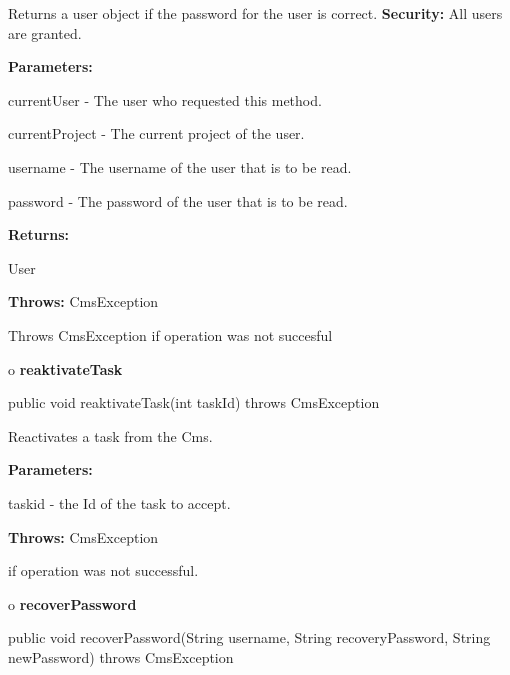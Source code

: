 \begin{description}
\htmlDD Returns a user object if the password for the user is correct. {\bf
Security:} All users are granted. 

\begin{description}
\item {\bf Parameters:}  

currentUser - The user who requested this method.  

currentProject - The current project of the user.  

username - The username of the user that is to be read.  

password - The password of the user that is to be read.  
\item {\bf Returns:}  

User  
\item {\bf Throws:} CmsException  

Throws CmsException if operation was not succesful  
\end{description}

\end{description}

o {\bf reaktivateTask} 

\begin{PRE}
 public void reaktivateTask(int taskId) throws CmsException
\end{PRE}

\begin{description}
\htmlDD Reactivates a task from the Cms. 

\begin{description}
\item {\bf Parameters:}  

taskid - the Id of the task to accept.  
\item {\bf Throws:} CmsException  

if operation was not successful.  
\end{description}

\end{description}

o {\bf recoverPassword} 

\begin{PRE}
 public void recoverPassword(String username,
                             String recoveryPassword,
                             String newPassword) throws CmsException
\end{PRE}

